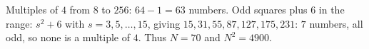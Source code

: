 Multiples of $4$ from $8$ to $256$: $64-1=63$ numbers. Odd squares plus $6$ in the range: $s^2+6$ with $s=3,5,\dots,15$, giving $15,31,55,87,127,175,231$: $7$ numbers, all odd, so none is a multiple of $4$. Thus $N=70$ and $N^2=\boxed{4900}$.
